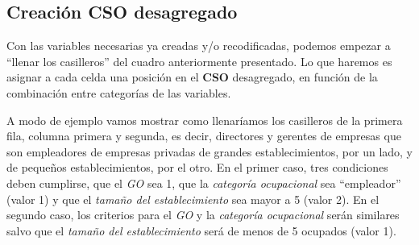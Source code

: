 \documentclass[
]{book}
\newenvironment{Shaded}{\begin{snugshade}}{\end{snugshade}}
\newcommand{\AttributeTok}[1]{\textcolor[rgb]{0.77,0.63,0.00}{#1}}
\newcommand{\ConstantTok}[1]{\textcolor[rgb]{0.00,0.00,0.00}{#1}}
\newcommand{\DecValTok}[1]{\textcolor[rgb]{0.00,0.00,0.81}{#1}}
\newcommand{\FunctionTok}[1]{\textcolor[rgb]{0.00,0.00,0.00}{#1}}
\newcommand{\NormalTok}[1]{#1}
\newcommand{\OtherTok}[1]{\textcolor[rgb]{0.56,0.35,0.01}{#1}}
\newcommand{\SpecialCharTok}[1]{\textcolor[rgb]{0.00,0.00,0.00}{#1}}
\newcommand{\StringTok}[1]{\textcolor[rgb]{0.31,0.60,0.02}{#1}}
\begin{document}
\begin{Shaded}
\end{Shaded}

\hypertarget{creaciuxf3n-cso-desagregado}{%
\subsection{Creación CSO desagregado}\label{creaciuxf3n-cso-desagregado}}

Con las variables necesarias ya creadas y/o recodificadas, podemos empezar a ``llenar los casilleros'' del cuadro anteriormente presentado. Lo que haremos es asignar a cada celda una posición en el \textbf{CSO} desagregado, en función de la combinación entre categorías de las variables.

A modo de ejemplo vamos mostrar como llenaríamos los casilleros de la primera fila, columna primera y segunda, es decir, directores y gerentes de empresas que son empleadores de empresas privadas de grandes establecimientos, por un lado, y de pequeños establecimientos, por el otro. En el primer caso, tres condiciones deben cumplirse, que el \emph{GO} sea 1, que la \emph{categoría ocupacional} sea ``empleador'' (valor 1) y que el \emph{tamaño del establecimiento} sea mayor a 5 (valor 2). En el segundo caso, los criterios para el \emph{GO} y la \emph{categoría ocupacional} serán similares salvo que el \emph{tamaño del establecimiento} será de menos de 5 ocupados (valor 1).
\end{document}
